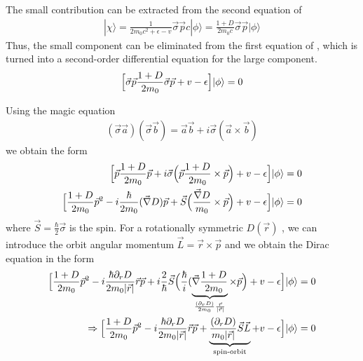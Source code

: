\documentclass[11pt,a4paper]{report}
\begin{document}
The small contribution can be extracted from the second equation of
\begin{eqnarray}
|\chi\rangle
=\frac{1}{2m_0c^2+\epsilon-v}
\vec{\sigma}\vec{p}c |\phi\rangle
=\frac{1+D}{2m_0c}
\vec{\sigma}\vec{p} |\phi\rangle
\label{eq:defsmallcomponent}
\end{eqnarray}
Thus, the small component can be eliminated from the first equation of
, which is turned into a second-order
differential equation for the large component.
\begin{eqnarray}
\Bigl[\vec{\sigma}\vec{p} \frac{1+D}{2m_0}
\vec{\sigma}\vec{p} +v-\epsilon\Bigr]|\phi\rangle=0
\label{eq:diraclargebeforemagic}
\end{eqnarray}

Using the magic equation
\begin{eqnarray}
(\vec{\sigma}\vec{a})(\vec{\sigma}\vec{b})
=\vec{a}\vec{b}+i\vec{\sigma}(\vec{a}\times\vec{b})
\end{eqnarray}
we obtain the form
\begin{eqnarray}
\Bigl[\vec{p} \frac{1+D}{2m_0}\vec{p} 
+i\vec{\sigma} 
\Bigl(\vec{p} \frac{1+D}{2m_0}\times\vec{p} \Bigr)
+v-\epsilon\Bigr]|\phi\rangle=0
\nonumber\\
\Bigl[\frac{1+D}{2m_0}\vec{p}^2-i\frac{\hbar}{2m_0}(\vec{\nabla}D)\vec{p}
+\vec{S}\Bigl(\frac{\vec{\nabla}D}{m_0}\times\vec{p} \Bigr)
+v-\epsilon\Bigr]|\phi\rangle=0
\end{eqnarray}
where $\vec{S}=\frac{\hbar}{2}\vec{\sigma}$ is the spin.  For a
rotationally symmetric $D(\vec{r})$ , we can
introduce the orbit angular momentum $\vec{L}=\vec{r}\times\vec{p}$
and we obtain the Dirac equation in the form
\begin{eqnarray}
\Bigl[
\frac{1+D}{2m_0}\vec{p}^2 
-i\frac{\hbar\partial_rD}{2m_0|\vec{r}|}\vec{r}\vec{p} 
+i\frac{2}{\hbar}\vec{S} 
\Bigl(\frac{\hbar}{i}(\underbrace{\vec{\nabla}\frac{1+D}{2m_0}}
_{\frac{(\partial_r D)}{2m_0}\frac{\vec{r}}{|\vec{r}|}}\times\vec{p} \Bigr)
+v-\epsilon\Bigr]|\phi\rangle=0
\nonumber\\
\Rightarrow\Bigl[
\frac{1+D}{2m_0}\vec{p}^2 
-i\frac{\hbar\partial_rD}{2m_0|\vec{r}|}\vec{r}\vec{p} 
+ \underbrace{\frac{(\partial_r D)}{m_0|\vec{r}|}\vec{S}\vec{L}}_{\text{spin-orbit}}
+v-\epsilon\Bigr]|\phi\rangle=0
\nonumber\\
\end{eqnarray}


\end{document}
